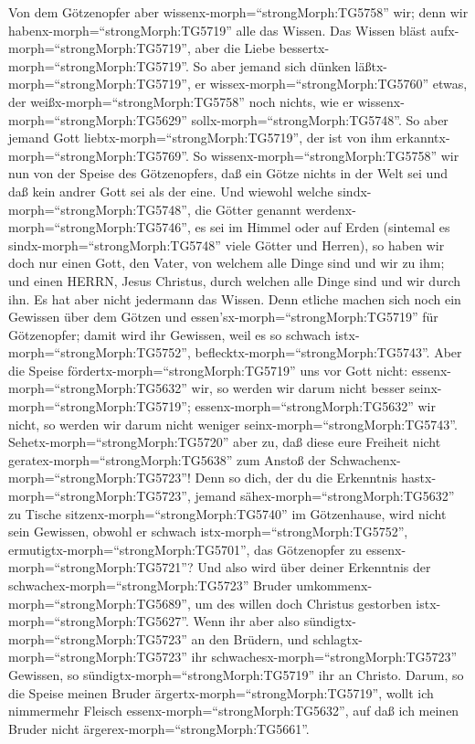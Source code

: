  Von dem Götzenopfer aber
wissenx-morph=``strongMorph:TG5758'' wir; denn wir
habenx-morph=``strongMorph:TG5719'' alle das Wissen. Das Wissen bläst
aufx-morph=``strongMorph:TG5719'', aber die Liebe
bessertx-morph=``strongMorph:TG5719''.  So aber jemand sich
dünken läßtx-morph=``strongMorph:TG5719'', er
wissex-morph=``strongMorph:TG5760'' etwas, der
weißx-morph=``strongMorph:TG5758'' noch nichts, wie er
wissenx-morph=``strongMorph:TG5629'' sollx-morph=``strongMorph:TG5748''.
 So aber jemand Gott liebtx-morph=``strongMorph:TG5719'',
der ist von ihm erkanntx-morph=``strongMorph:TG5769''.  So
wissenx-morph=``strongMorph:TG5758'' wir nun von der Speise des
Götzenopfers, daß ein Götze nichts in der Welt sei und daß kein andrer
Gott sei als der eine.  Und wiewohl welche
sindx-morph=``strongMorph:TG5748'', die Götter genannt
werdenx-morph=``strongMorph:TG5746'', es sei im Himmel oder auf Erden
(sintemal es sindx-morph=``strongMorph:TG5748'' viele Götter und
Herren),  so haben wir doch nur einen Gott, den Vater, von
welchem alle Dinge sind und wir zu ihm; und einen HERRN, Jesus Christus,
durch welchen alle Dinge sind und wir durch ihn.  Es hat
aber nicht jedermann das Wissen. Denn etliche machen sich noch ein
Gewissen über dem Götzen und essen'sx-morph=``strongMorph:TG5719'' für
Götzenopfer; damit wird ihr Gewissen, weil es so schwach
istx-morph=``strongMorph:TG5752'',
beflecktx-morph=``strongMorph:TG5743''.  Aber die Speise
fördertx-morph=``strongMorph:TG5719'' uns vor Gott nicht:
essenx-morph=``strongMorph:TG5632'' wir, so werden wir darum nicht
besser seinx-morph=``strongMorph:TG5719'';
essenx-morph=``strongMorph:TG5632'' wir nicht, so werden wir darum nicht
weniger seinx-morph=``strongMorph:TG5743''. 
Sehetx-morph=``strongMorph:TG5720'' aber zu, daß diese eure Freiheit
nicht geratex-morph=``strongMorph:TG5638'' zum Anstoß der
Schwachenx-morph=``strongMorph:TG5723''!  Denn so dich, der
du die Erkenntnis hastx-morph=``strongMorph:TG5723'', jemand
sähex-morph=``strongMorph:TG5632'' zu Tische
sitzenx-morph=``strongMorph:TG5740'' im Götzenhause, wird nicht sein
Gewissen, obwohl er schwach istx-morph=``strongMorph:TG5752'',
ermutigtx-morph=``strongMorph:TG5701'', das Götzenopfer zu
essenx-morph=``strongMorph:TG5721''?  Und also wird über
deiner Erkenntnis der schwachex-morph=``strongMorph:TG5723'' Bruder
umkommenx-morph=``strongMorph:TG5689'', um des willen doch Christus
gestorben istx-morph=``strongMorph:TG5627''.  Wenn ihr aber
also sündigtx-morph=``strongMorph:TG5723'' an den Brüdern, und
schlagtx-morph=``strongMorph:TG5723'' ihr
schwachesx-morph=``strongMorph:TG5723'' Gewissen, so
sündigtx-morph=``strongMorph:TG5719'' ihr an Christo. 
Darum, so die Speise meinen Bruder ärgertx-morph=``strongMorph:TG5719'',
wollt ich nimmermehr Fleisch essenx-morph=``strongMorph:TG5632'', auf
daß ich meinen Bruder nicht ärgerex-morph=``strongMorph:TG5661''.

